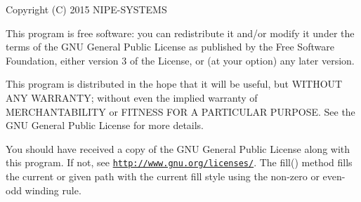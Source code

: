 Copyright (C) 2015 N\+I\+P\+E-\/\+S\+Y\+S\+T\+E\+M\+S

This program is free software\+: you can redistribute it and/or modify it under the terms of the G\+N\+U General Public License as published by the Free Software Foundation, either version 3 of the License, or (at your option) any later version.

This program is distributed in the hope that it will be useful, but W\+I\+T\+H\+O\+U\+T A\+N\+Y W\+A\+R\+R\+A\+N\+T\+Y; without even the implied warranty of M\+E\+R\+C\+H\+A\+N\+T\+A\+B\+I\+L\+I\+T\+Y or F\+I\+T\+N\+E\+S\+S F\+O\+R A P\+A\+R\+T\+I\+C\+U\+L\+A\+R P\+U\+R\+P\+O\+S\+E. See the G\+N\+U General Public License for more details.

You should have received a copy of the G\+N\+U General Public License along with this program. If not, see \href{http://www.gnu.org/licenses/}{\tt http\+://www.\+gnu.\+org/licenses/}. The fill() method fills the current or given path with the current fill style using the non-\/zero or even-\/odd winding rule. 